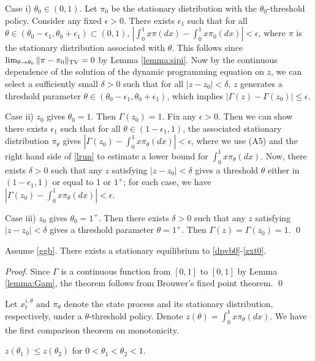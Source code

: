 \documentclass[graybox]{svmult}
\begin{document}
Case i) $\theta_0\in (0,1)$.  Let $\pi_0$ be the
stationary distribution with the $\theta_0$-threshold  policy.  Consider any fixed $\epsilon>0$.
There exists $\epsilon_1$ such that for all $\theta\in (\theta_0-\epsilon_1, \theta_0+\epsilon_1)\subset (0, 1)$, $|\int_0^1 x\pi(dx)-\int_0^1 x\pi_0(dx)|
<\epsilon$, where $\pi$ is the stationary distribution associated with $\theta$. This follows since $\lim_{\theta\to \theta_0}\|\pi-\pi_0\|_{\rm TV}=0$ by Lemma \ref{lemma:sipi}.
 Now by the continuous dependence of the solution of the dynamic programming equation on $z$, we can select a sufficiently small $\delta>0$ such that for all $|z-z_0|<\delta$, $z$ generates a threshold parameter $\theta\in (\theta_0-\epsilon_1, \theta_0+\epsilon_1)$, which implies $
 |\Gamma (z)-\Gamma(z_0)|\le \epsilon$.


Case ii) $z_0$ gives $\theta_0=1$. Then $\Gamma (z_0)=1$.
Fix any $\epsilon>0$. Then we can show there exists $\epsilon_1$ such that  for all $\theta\in (1-\epsilon_1, 1)$, the associated stationary distribution $\pi_\theta$ gives $ |\Gamma(z_0)- \int_0^1 x \pi_\theta(dx)|<\epsilon$, where we use (A5) and the right hand  side of \eqref{lrun} to estimate a lower bound for $ \int_0^1 x \pi_\theta(dx)$.
Now, there exists $\delta>0$ such that any $z$ satisfying $|z-z_0|<\delta$
gives a threshold $\theta$ either in $(1-\epsilon_1, 1)$ or equal to 1 or $1^+$; for each case, we have
$ |\Gamma(z_0)- \int_0^1 x \pi_\theta(dx)|<\epsilon$.



Case iii) $z_0$ gives $\theta_0=1^+$. Then there exists $\delta>0$ such that any
$z$ satisfying $|z-z_0|<\delta$ gives a threshold parameter
$\theta=1^+$. Then $\Gamma (z)=\Gamma (z_0)=1$. \qed


\begin{theorem}\label{theorem:mfgdi}
Assume \eqref{ggb}. There exists a stationary equilibrium to \eqref{dpvb0}-\eqref{zxt0}.
\end{theorem}

\begin{proof}
Since $\Gamma$ is a continuous function from $[0, 1]$ to $[0,1]$ by Lemma \ref{lemma:Gam},   the theorem follows from Brouwer's fixed point theorem.    \qed
\end{proof}




Let  $x_t^{i,\theta}  $   and $\pi_\theta$ denote the state process and its  stationary distribution, respectively,  under a $\theta$-threshold policy.
Denote
$z(\theta) = \int_0^1 x \pi_\theta(dx).$
We have the first comparison  theorem on  monotonicity.
\begin{lemma}\label{theorem:zmono}
 $z(\theta_1)\le z(\theta_2)$ for $0<\theta_1<\theta_2<1$.
\end{lemma}
\end{document}

